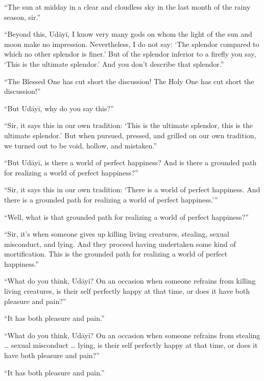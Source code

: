 \documentclass[12pt,openany]{book}%
\begin{document}
“The sun at midday in a clear and cloudless sky in the last month of the rainy season, sir.” 

“Beyond this, \textsanskrit{Udāyī}, I know very many gods on whom the light of the sun and moon make no impression. Nevertheless, I do not say: ‘The splendor compared to which no other splendor is finer.’ But of the splendor inferior to a firefly you say, ‘This is the ultimate splendor.’ And you don’t describe that splendor.” 

“The Blessed One has cut short the discussion! The Holy One has cut short the discussion!” 

“But \textsanskrit{Udāyī}, why do you say this?” 

“Sir, it says this in our own tradition: ‘This is the ultimate splendor, this is the ultimate splendor.’ But when pursued, pressed, and grilled on our own tradition, we turned out to be void, hollow, and mistaken.” 

“But \textsanskrit{Udāyī}, is there a world of perfect happiness? And is there a grounded path for realizing a world of perfect happiness?” 

“Sir, it says this in our own tradition: ‘There is a world of perfect happiness. And there is a grounded path for realizing a world of perfect happiness.’” 

“Well, what is that grounded path for realizing a world of perfect happiness?” 

“Sir, it’s when someone gives up killing living creatures, stealing, sexual misconduct, and lying. And they proceed having undertaken some kind of mortification. This is the grounded path for realizing a world of perfect happiness.” 

“What do you think, \textsanskrit{Udāyī}? On an occasion when someone refrains from killing living creatures, is their self perfectly happy at that time, or does it have both pleasure and pain?” 

“It has both pleasure and pain.” 

“What do you think, \textsanskrit{Udāyī}? On an occasion when someone refrains from stealing … sexual misconduct … lying, is their self perfectly happy at that time, or does it have both pleasure and pain?” 

“It has both pleasure and pain.” 
\end{document}

